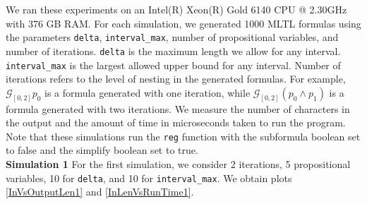 \documentclass[runningheads]{llncs}
\begin{document}
We ran these experiments on an Intel(R) Xeon(R) Gold 6140 CPU @ 2.30GHz with 376 GB RAM.
For each simulation, we generated 1000 MLTL formulas using the parameters \texttt{delta}, \texttt{interval\_max}, number of propositional variables, and number of iterations. \texttt{delta} is the maximum length we allow for any interval. \texttt{interval\_max} is the largest allowed upper bound for any interval. Number of iterations refers to the level of nesting in the generated formulas. For example, $\mathcal{G}_{[0,2]}p_0$ is a formula generated with one iteration, while $\mathcal{G}_{[0,2]}(p_0 \land p_1)$ is a formula generated with two iterations. We measure the number of characters in the output and the amount of time in microseconds taken to run the program. Note that these simulations run the \texttt{reg} function with the subformula boolean set to false and the simplify boolean set to true.\\
\noindent\textbf{Simulation 1}
For the first simulation, we consider 2 iterations, 5 propositional variables, 10 for \texttt{delta}, and 10 for \texttt{interval\_max}. We obtain plots \ref{InVsOutputLen1} and \ref{InLenVsRunTime1}.
\end{document}
